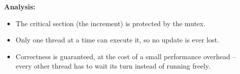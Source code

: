 \textbf{Analysis:} %
\begin{itemize}
    \item The critical section (the increment) is protected by the mutex. %
    \item Only one thread at a time can execute it, so no update is ever lost. %
    \item Correctness is guaranteed, at the cost of a small performance overhead -- every other thread has to wait its turn instead of running freely. %
\end{itemize}





